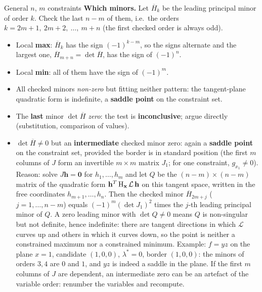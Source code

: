 \begin{rulebox}{General $n$, $m$ constraints}
\textbf{Which minors.} Let $\overline{H}_k$ be the leading principal minor
of order $k$. Check the last $n-m$ of them, i.e.\ the orders
$k=2m+1,\ 2m+2,\ \dots,\ m+n$ (the first checked order is always odd).
\begin{itemize}[leftmargin=1.6em,itemsep=0.3ex]
  \item Local \textbf{max}: $\overline{H}_k$ has the sign $(-1)^{k-m}$,
        so the signs alternate and the largest one, $\overline{H}_{m+n}=\det\overline{H}$,
        has the sign of $(-1)^{n}$.
  \item Local \textbf{min}: all of them have the sign of $(-1)^{m}$.
  \item All checked minors \emph{non-zero} but fitting neither pattern:
        the tangent-plane quadratic form is indefinite, a
        \textbf{saddle point} on the constraint set.
  \item The \textbf{last} minor $\det\overline{H}$ \emph{zero}: the test is
        \textbf{inconclusive}; argue directly (substitution, comparison of
        values).
  \item $\det\overline{H}\neq0$ but an \textbf{intermediate} checked minor
        zero: again a \textbf{saddle point} on the constraint set, provided
        the border is in standard position (the first $m$ columns of $J$
        form an invertible $m\times m$ matrix $J_{1}$; for one constraint,
        $g_{x_1}\neq0$). Reason: solve $J\mathbf{h}=\mathbf{0}$ for
        $h_{1},\dots,h_{m}$ and let $Q$ be the $(n-m)\times(n-m)$ matrix of
        the quadratic form $\mathbf{h}^{T}\operatorname{H}_{\mathbf{x}}\mathcal{L}\,\mathbf{h}$
        on this tangent space, written in the free coordinates
        $h_{m+1},\dots,h_{n}$. Then the checked minor $\overline{H}_{2m+j}$
        ($j=1,\dots,n-m$) equals $(-1)^{m}(\det J_{1})^{2}$ times the
        $j$-th leading principal minor of $Q$. A zero leading minor
        with $\det Q\neq0$ means $Q$ is non-singular but not definite,
        hence indefinite: there are tangent directions in which
        $\mathcal L$ curves up and others in which it curves down, so the
        point is neither a constrained maximum nor a constrained minimum.
        Example: $f=yz$ on the plane $x=1$, candidate $(1,0,0)$,
        $\lambda^*=0$, border $(1,0,0)$: the minors of orders $3,4$ are
        $0$ and $1$, and $yz$ is indeed a saddle in the plane. If the first
        $m$ columns of $J$ are dependent, an intermediate zero can be an
        artefact of the variable order: renumber the variables and
        recompute.
\end{itemize}

\end{rulebox}
